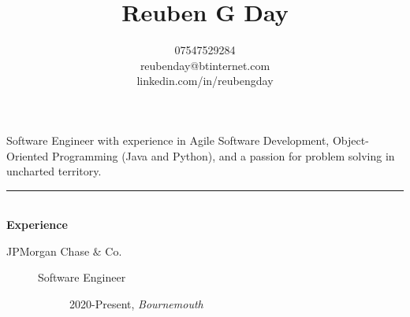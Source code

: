 \documentclass[12pt, a4paper]{article}
\date{}
\title{\vspace{-6ex}Reuben G Day }
\author{07547529284 \\ reubenday@btinternet.com \\ linkedin.com/in/reubengday} %
\begin{document}
    \maketitle
    \vspace{-5ex}

    \begin{center}
        Software Engineer with experience in Agile Software Development, Object-Oriented Programming (Java and Python), and a passion for problem solving in uncharted territory.
    \end{center}

    \vspace{-2ex}

    \noindent\rule{8cm}{0.4pt} \\
    \textbf{Experience}
    \begin{description}
        \item[JPMorgan Chase $\&$ Co.]\textbf{}
        \begin{description}
            \item[Software Engineer] 2020-Present, \textit{Bournemouth}

        \end{description}

    \end{description}

    \vspace{-2ex}
\end{document}
